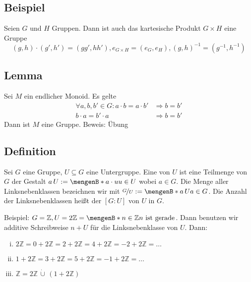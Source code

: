 \subsection[Beispiel: Das kartesische Produkt von Gruppen ist auch eine Gruppe]{Beispiel} %
\label{sub:113}
Seien $G$ und $H$ Gruppen. Dann ist auch das kartesische Produkt $G \times H$ eine Gruppe
\[
	(g,h) \cdot (g', h') = (g g', h h') , e_{G\times H} = (e_G, e_H), (g,h) ^{-1} = (g ^{-1} , h ^{-1})
\]

\subsection[Lemma: Endliche Monoide, die links- und rechtskürzbar sind, sind Gruppen]{Lemma} %
\label{sub:114}
Sei $M$ ein endlicher Monoid. Es gelte
\begin{align*}
	\forall a,b,b' \in G : a \cdot b = a \cdot b' &\Rightarrow b=b' \\
	b \cdot a = b' \cdot a &\Rightarrow b=b'
\end{align*}
Dann ist $M$ eine Gruppe. Beweis: Übung

\subsection[Definition: Linksnebenklasse und Index]{Definition} %
\label{sub:115}
Sei $G$ eine Gruppe, $U \subseteq G$ eine Untergruppe. Eine  von $U$ ist eine Teilmenge von $G$ der Gestalt $a\, U := \set[a \cdot u]{u \in U} $
wobei $a \in G$. Die Menge aller Linksnebenklassen bezeichnen wir mit  $\nicefrac{G}{U} := \set[a\, U]{a \in G} $. Die Anzahl der Linksnebenklassen heißt der  
$[G:U]$ von $U$ in $G$.

Beispiel: $G= \mathds{Z}, U = 2\mathds{Z} = \set[n \in \mathds{Z}]{n \text{ ist gerade}} $. Dann benutzen wir additive Schreibweise $n+U$ für die Linksnebenklasse von $U$.
Dann:
\begin{enumerate}[i)]
	\item $2\mathds{Z} = 0+2\mathds{Z} = 2+2\mathds{Z} = 4+2\mathds{Z}= -2+2\mathds{Z}= \ldots $
	\item $1+2\mathds{Z} = 3+2\mathds{Z} = 5+2\mathds{Z}=-1+2\mathds{Z} = \ldots $
	\item $\mathds{Z} = 2\mathds{Z} \, \dot\cup \, (1+2\mathds{Z})$
\end{enumerate}

